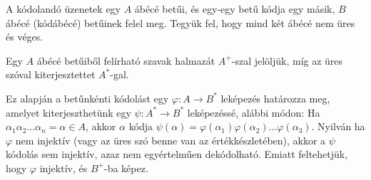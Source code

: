 \documentclass[margin=0px]{article}
\begin{document}
			A kódolandó üzenetek egy $A$ ábécé betűi, és egy-egy betű kódja egy másik, $B$ ábécé (kódábécé) betűinek felel meg. Tegyük fel, hogy mind két ábécé nem üres és véges.
			
			Egy $A$ ábécé betűiből felírható szavak halmazát $A^+$-szal jelöljük, míg az üres szóval kiterjesztettet $A^*$-gal.
			
			Ez alapján a betűnkénti kódolást egy $\varphi: A \rightarrow B^*$ leképezés határozza meg, amelyet kiterjeszthetünk egy $\psi: A^* \rightarrow B^*$ leképezéssé, alábbi módon: Ha $\alpha_1\alpha_2...\alpha_n = \alpha \in A$, akkor $\alpha$ kódja $\psi(\alpha) = \varphi(\alpha_1)\varphi(\alpha_2)...\varphi(\alpha_3)$. Nyilván ha $\varphi$ nem injektív (vagy az üres szó benne van az értékkészletében), akkor a $\psi$ kódolás sem injektív, azaz nem egyértelműen dekódolható. Emiatt feltehetjük, hogy $\varphi$ injektív, és $B^+$-ba képez.
			
\end{document}
